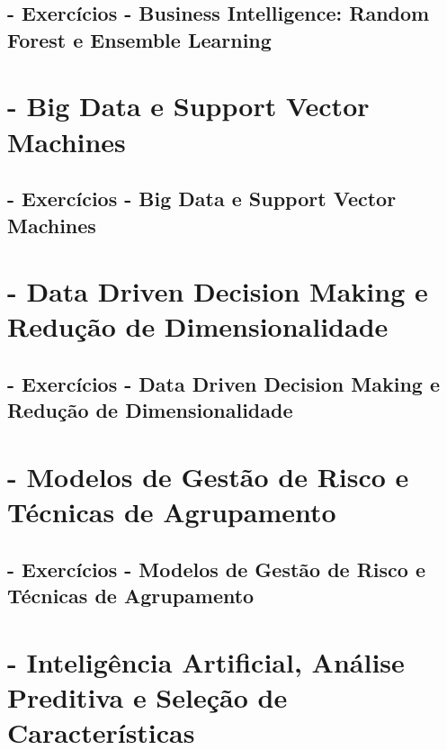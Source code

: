 \documentclass[
]{book}
\begin{document}
\section{- Exercícios - Business Intelligence: Random Forest e Ensemble Learning}\label{exercuxedcios---business-intelligence-random-forest-e-ensemble-learning}

\chapter{- Big Data e Support Vector Machines}\label{big-data-e-support-vector-machines}

\section{- Exercícios - Big Data e Support Vector Machines}\label{exercuxedcios---big-data-e-support-vector-machines}

\chapter{- Data Driven Decision Making e Redução de Dimensionalidade}\label{data-driven-decision-making-e-reduuxe7uxe3o-de-dimensionalidade}

\section{- Exercícios - Data Driven Decision Making e Redução de Dimensionalidade}\label{exercuxedcios---data-driven-decision-making-e-reduuxe7uxe3o-de-dimensionalidade}

\chapter{- Modelos de Gestão de Risco e Técnicas de Agrupamento}\label{modelos-de-gestuxe3o-de-risco-e-tuxe9cnicas-de-agrupamento}

\section{- Exercícios - Modelos de Gestão de Risco e Técnicas de Agrupamento}\label{exercuxedcios---modelos-de-gestuxe3o-de-risco-e-tuxe9cnicas-de-agrupamento}

\chapter{- Inteligência Artificial, Análise Preditiva e Seleção de Características}\label{inteliguxeancia-artificial-anuxe1lise-preditiva-e-seleuxe7uxe3o-de-caracteruxedsticas}
\end{document}
